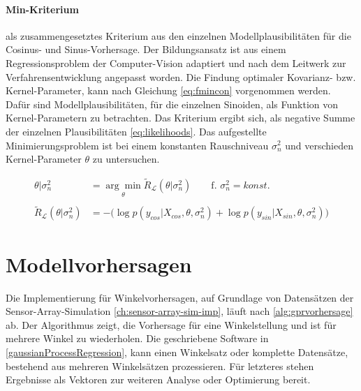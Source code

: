 \clearpage


\paragraph*{Min-Kriterium} als zusammengesetztes Kriterium aus den einzelnen Modellplausibilitäten für die Cosinus- und Sinus-Vorhersage. Der Bildungsansatz ist aus einem Regressionsproblem der Computer-Vision \cite{Guerrero2014} adaptiert und nach dem Leitwerk zur Verfahrensentwicklung \cite{Rasmussen2006} angepasst worden. Die Findung optimaler Kovarianz- bzw. Kernel-Parameter, kann nach Gleichung \autoref{eq:fmincon} vorgenommen werden. Dafür sind Modellplausibilitäten, für die einzelnen Sinoiden, als Funktion von Kernel-Parametern zu betrachten. Das Kriterium ergibt sich, als negative Summe der einzelnen Plausibilitäten \autoref{eq:likelihoods}. Das aufgestellte Minimierungsproblem ist bei einem konstanten Rauschniveau $\sigma_n^2$ und verschieden Kernel-Parameter $\theta$ zu untersuchen.


\begin{align}\label{eq:fmincon}
\theta|\sigma_n^2 &= \underset{\theta}{\arg\min} \tilde{R}_{\mathcal{L}}(\theta|\sigma_n^2) \qquad \text{f. } \sigma_n^2 = konst. \nonumber \\
\\
\tilde{R}_{\mathcal{L}}(\theta|\sigma_n^2) &= -\big( \log p(y_{cos}|X_{cos}, \theta, \sigma_n^2) + \log p(y_{sin}|X_{sin}, \theta, \sigma_n^2) \big) \nonumber
\end{align}


\clearpage


\section{Modellvorhersagen}\label{sec:gprpred}


Die Implementierung für Winkelvorhersagen, auf Grundlage von Datensätzen der Sensor-Array-Simulation \autoref{ch:sensor-array-sim-imp}, läuft nach \autoref{alg:gprvorhersage} ab. Der Algorithmus zeigt, die Vorhersage für eine Winkelstellung und ist für mehrere Winkel zu wiederholen. Die geschriebene Software in \autoref{gaussianProcessRegression}, kann einen Winkelsatz oder komplette Datensätze, bestehend aus mehreren Winkelsätzen prozessieren. Für letzteres stehen Ergebnisse als Vektoren zur weiteren Analyse oder Optimierung bereit.


